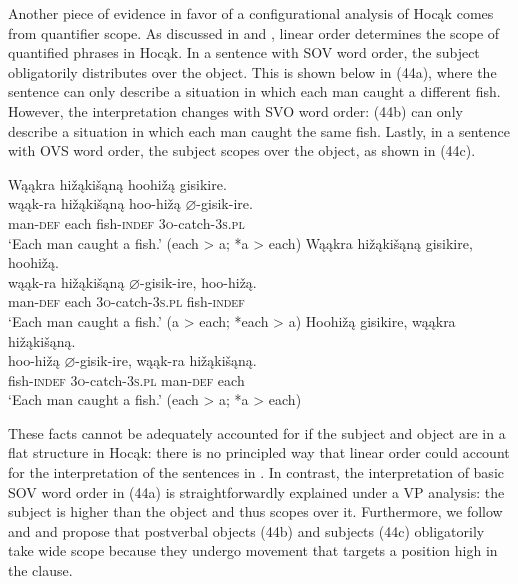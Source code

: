 \documentclass[output=paper]{LSP/langsci}
\begin{document}
Another piece of evidence in favor of a configurational analysis of Hocąk comes from quantifier scope. As discussed in \citealt{Johnson2014} and   \citealt{JohnsonRosen2014}, linear order determines the scope of quantified phrases in Hocąk. In a sentence with SOV word order, the subject obligatorily distributes over the object. This is shown below in (44a), where the sentence can only describe a situation in which each man caught a different fish. However, the interpretation changes with SVO word order: (44b) can only describe a situation in which each man caught the same fish. Lastly, in a sentence with OVS word order, the subject scopes over the object, as shown in (44c).

\begin{exe}
\ex
\begin{xlist}
\ex 
\glll Wąąkra	hi\v{z}ąki\v{s}ąną		hoohi\v{z}ą	gisikire.\\
wąąk-ra		hi\v{z}ąki\v{s}ąną		hoo-hi\v{z}ą	$\varnothing$-gisik-ire. \\
		man-\textsc{def}		each					fish-\textsc{indef}		\textsc{3o}-catch-\textsc{3s.pl} \\
\trans `Each man caught a fish.' (each > a; *a > each)
\ex 
\glll Wąąkra		hi\v{z}ąki\v{s}ąną		gisikire,			hoohi\v{z}ą.\\
wąąk-ra		hi\v{z}ąki\v{s}ąną		$\varnothing$-gisik-ire,	hoo-hi\v{z}ą. \\
		man-\textsc{def}		each					\textsc{3o}-catch-\textsc{3s.pl}		fish-\textsc{indef} \\
\trans `Each man caught a fish.'  (a > each; *each > a)
\ex 
\glll Hoohi\v{z}ą	gisikire,	wąąkra	 hi\v{z}ąki\v{s}ąną.\\
hoo-hi\v{z}ą	$\varnothing$-gisik-ire,		wąąk-ra	hi\v{z}ąki\v{s}ąną. \\
		fish-\textsc{indef}		\textsc{3o}-catch-\textsc{3s.pl}		man-\textsc{def}		each \\
\trans `Each man caught a fish.' (each > a; *a > each)
\end{xlist}
\end{exe}

These facts cannot be adequately accounted for if the subject and object are in a flat structure in Hocąk: there is no principled way that linear order could account for the interpretation of the sentences in . In contrast, the interpretation of basic SOV word order in (44a) is straightforwardly explained under a VP analysis: the subject is higher than the object and thus scopes over it. Furthermore, we follow \citet{Johnson2014} and  \citet{JohnsonRosen2014} and propose that postverbal objects (44b) and subjects (44c) obligatorily take wide scope because they undergo movement that targets a position high in the clause. 
\end{document}

